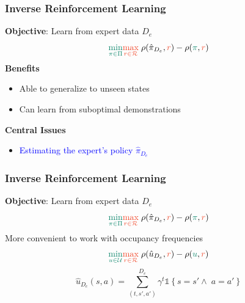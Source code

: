 \documentclass{beamer}
\begin{document}
\begin{frame}
	\frametitle{Inverse Reinforcement Learning}
	\textbf{Objective}: Learn from expert data $D_e$
	\[ 
		\textcolor{PineGreen}{\min_{\pi \in \Pi}} \textcolor{RedOrange}{\max_{r \in \mathcal{R}}} \; \rho(\hat{\pi}_{D_e}, \textcolor{RedOrange}{r}) - \rho(\textcolor{PineGreen}{\pi}, \textcolor{RedOrange}{r})
	\]
	\vfill
	\textbf{Benefits}
	\begin{itemize}
		\item Able to generalize to unseen states
		\item Can learn from suboptimal demonstrations
	\end{itemize}
	\vfill
	\textbf{Central Issues}
	\begin{itemize}
		\item \textcolor{blue}{Estimating the expert's policy $\hat{\pi}_{D_e}$}
	\end{itemize}
\end{frame}

\begin{frame}
	\frametitle{Inverse Reinforcement Learning}
	\textbf{Objective}: Learn from expert data $D_e$
	\[ 
		\textcolor{PineGreen}{\min_{\pi \in \Pi}} \textcolor{RedOrange}{\max_{r \in \mathcal{R}}}\; \rho(\hat{\pi}_{D_e}, \textcolor{RedOrange}{r}) - \rho(\textcolor{PineGreen}{\pi}, \textcolor{RedOrange}{r})
	\]
	\vfill
	More convenient to work with occupancy frequencies
	\[
		\textcolor{PineGreen}{\min_{u \in \mathcal{U}}} \textcolor{RedOrange}{\max_{r \in \mathcal{R}}}\; \rho(\hat{u}_{D_e}, \textcolor{RedOrange}{r}) - \rho(\textcolor{PineGreen}{u}, \textcolor{RedOrange}{r})
	\]
	\vfill
	\[
		\hat{u}_{D_e}(s,a) = \sum_{(t, s',a')}^{D_e} \gamma^t \mathds{1} \left\{s=s' \wedge\; a=a'\right\}
	\]
\end{frame}
\end{document}
